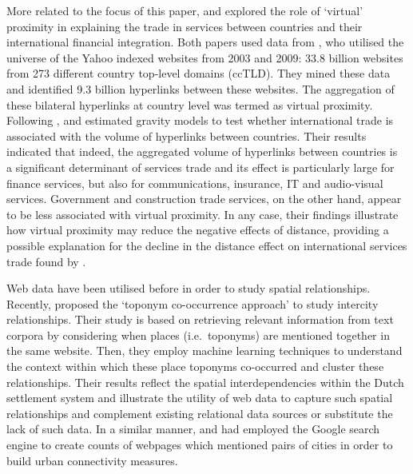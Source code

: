 \documentclass[sigconf]{acmart}
\begin{document}
More related to the focus of this paper, \citet{hellmanzik2016gravity}
and \citet{hellmanzik2017taking} explored the role of `virtual'
proximity in explaining the trade in services between countries and
their international financial integration. Both papers used data from
\citet{chung2011geography}, who utilised the universe of the Yahoo
indexed websites from 2003 and 2009: 33.8 billion websites from 273
different country top-level domains (ccTLD). They mined these data and
identified 9.3 billion hyperlinks between these websites. The
aggregation of these bilateral hyperlinks at country level was termed as
virtual proximity. Following \citet{kimura2006gravity},
\citet{hellmanzik2016gravity} and \citet{hellmanzik2017taking} estimated
gravity models to test whether international trade is associated with
the volume of hyperlinks between countries. Their results indicated that
indeed, the aggregated volume of hyperlinks between countries is\\
a significant determinant of services trade and its effect is
particularly large for finance services, but also for communications,
insurance, IT and audio-visual services. Government and construction
trade services, on the other hand, appear to be less associated with
virtual proximity. In any case, their findings illustrate how virtual
proximity may reduce the negative effects of distance, providing a
possible explanation for the decline in the distance effect on
international services trade found by \citet{head2009remote}.

Web data have been utilised before in order to study spatial
relationships. Recently, \citet{meijers2019using} proposed the `toponym
co-occurrence approach' to study intercity relationships. Their study is
based on retrieving relevant information from text corpora by
considering when places (i.e.~toponyms) are mentioned together in the
same website. Then, they employ machine learning techniques to
understand the context within which these place toponyms co-occurred and
cluster these relationships. Their results reflect the spatial
interdependencies within the Dutch settlement system and illustrate the
utility of web data to capture such spatial relationships and complement
existing relational data sources or substitute the lack of such data. In
a similar manner, \citet{devriendt2008cyberplace} and
\citet{janc2015visibility} had employed the Google search engine to
create counts of webpages which mentioned pairs of cities in order to
build urban connectivity measures.
\end{document}
